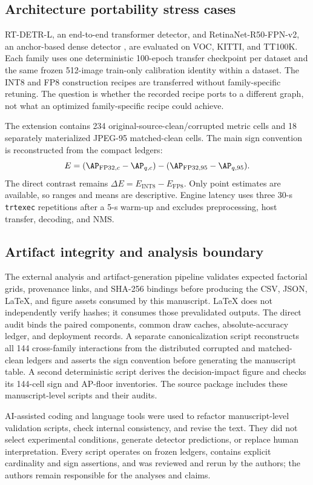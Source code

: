 \subsection{Architecture portability stress cases}
\label{sec:crossfamily-methods}

RT-DETR-L, an end-to-end transformer detector\citep{carion2020detr,
zhao2024rtdetr}, and RetinaNet-R50-FPN-v2, an anchor-based dense detector
\citep{lin2017focal,torchvision2026retinanet}, are evaluated on VOC, KITTI, and
TT100K. Each family uses one deterministic 100-epoch transfer checkpoint per
dataset and the same frozen 512-image train-only calibration identity within a
dataset. The INT8 and FP8 construction recipes are transferred without
family-specific retuning. The question is whether the recorded recipe ports to
a different graph, not what an optimized family-specific recipe could achieve.

The extension contains 234 original-source-clean/corrupted metric cells and 18
separately materialized JPEG-95 matched-clean cells. The main sign convention
is reconstructed from the compact ledgers:
\begin{equation}
E=(\AP_{\mathrm{FP32},c}-\AP_{q,c})-
  (\AP_{\mathrm{FP32},95}-\AP_{q,95}).
\end{equation}
The direct contrast remains $\Delta E=E_{\mathrm{INT8}}-E_{\mathrm{FP8}}$.
Only point estimates are available, so ranges and means are descriptive. Engine
latency uses three 30-s \texttt{trtexec} repetitions after a 5-s warm-up and
excludes preprocessing, host transfer, decoding, and NMS.

\subsection{Artifact integrity and analysis boundary}
\label{sec:integrity}

The external analysis and artifact-generation pipeline validates expected
factorial grids, provenance links, and SHA-256 bindings before producing the
CSV, JSON, LaTeX, and figure assets consumed by this manuscript. LaTeX does not
independently verify hashes; it consumes those prevalidated outputs. The direct
audit binds the paired components, common draw caches, absolute-accuracy ledger,
and deployment records. A separate canonicalization script reconstructs all
144 cross-family interactions from the distributed corrupted and matched-clean
ledgers and asserts the sign convention before generating the manuscript table.
A second deterministic script derives the decision-impact figure and checks its
144-cell sign and AP-floor inventories. The source package includes these
manuscript-level scripts and their audits.

AI-assisted coding and language tools were used to refactor manuscript-level
validation scripts, check internal consistency, and revise the text. They did
not select experimental conditions, generate detector predictions, or replace
human interpretation. Every script operates on frozen ledgers, contains explicit
cardinality and sign assertions, and was reviewed and rerun by the authors; the
authors remain responsible for the analyses and claims.
